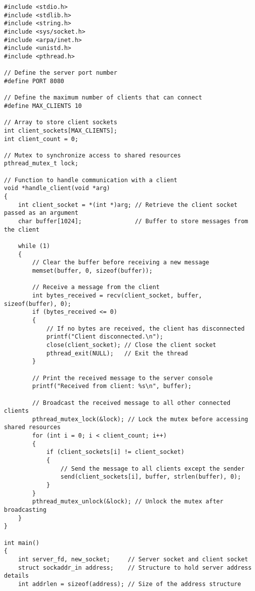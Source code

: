 \documentclass[a4paper,12pt]{article}
\begin{document}
\begin{lstlisting}[caption={Local System Server Code}, label={lst:local-server}]
#include <stdio.h>
#include <stdlib.h>
#include <string.h>
#include <sys/socket.h>
#include <arpa/inet.h>
#include <unistd.h>
#include <pthread.h>

// Define the server port number
#define PORT 8080

// Define the maximum number of clients that can connect
#define MAX_CLIENTS 10

// Array to store client sockets
int client_sockets[MAX_CLIENTS];
int client_count = 0;

// Mutex to synchronize access to shared resources
pthread_mutex_t lock;

// Function to handle communication with a client
void *handle_client(void *arg)
{
    int client_socket = *(int *)arg; // Retrieve the client socket passed as an argument
    char buffer[1024];               // Buffer to store messages from the client

    while (1)
    {
        // Clear the buffer before receiving a new message
        memset(buffer, 0, sizeof(buffer));

        // Receive a message from the client
        int bytes_received = recv(client_socket, buffer, sizeof(buffer), 0);
        if (bytes_received <= 0)
        {
            // If no bytes are received, the client has disconnected
            printf("Client disconnected.\n");
            close(client_socket); // Close the client socket
            pthread_exit(NULL);   // Exit the thread
        }

        // Print the received message to the server console
        printf("Received from client: %s\n", buffer);

        // Broadcast the received message to all other connected clients
        pthread_mutex_lock(&lock); // Lock the mutex before accessing shared resources
        for (int i = 0; i < client_count; i++)
        {
            if (client_sockets[i] != client_socket)
            {
                // Send the message to all clients except the sender
                send(client_sockets[i], buffer, strlen(buffer), 0);
            }
        }
        pthread_mutex_unlock(&lock); // Unlock the mutex after broadcasting
    }
}

int main()
{
    int server_fd, new_socket;     // Server socket and client socket
    struct sockaddr_in address;    // Structure to hold server address details
    int addrlen = sizeof(address); // Size of the address structure


\end{lstlisting}
\end{document}

